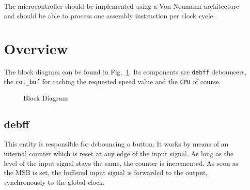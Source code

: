 \documentclass[a4paper,10pt]{scrartcl}
\begin{document}
The microcontroller should be implemented using a Von Neumann architecture and should be able to process one assembly instruction per clock cycle. 


\section{Overview}
\label{sec:block}

The block diagram can be found in Fig.\ \ref{fig:block}. 
Its components are \texttt{debff} debouncers, the \texttt{rot\_buf} for caching the requested speed value and the \texttt{CPU} of course. 


\begin{figure}[ht]
	\centering
\noindent{}
	\caption{Block Diagram}
	\label{fig:block}
\end{figure}

\subsection{debff}
\label{sec:debff}

This entity is responsible for debouncing a button. 
It works by means of an internal counter which is reset at any edge of the input signal. 
As long as the level of the input signal stays the same, the counter is incremented. 
As soon as the MSB is set, the buffered input signal is forwarded to the output, synchronously to the global clock.
\end{document}
